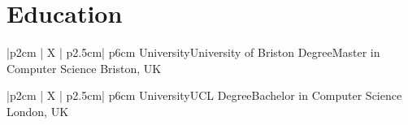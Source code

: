 
\section{Education}
\begin{mySectionContents}
%
%
\iftrue %
\begin{myTableEnv}{|p{2cm} | X | p{2.5cm}| p{6cm}}
    \myRow
        {\myPeriod}{}%
        {University}{University of Briston} %
    \myRow
        {Degree}{Master in Computer Science} %
        {\myLocation}{Briston, UK}%
    \myTableContents{
    }
\end{myTableEnv}
%
%
\myTablesSeparator
%
%
\fi%
%
%
\iftrue %
\begin{myTableEnv}{|p{2cm} | X | p{2.5cm}| p{6cm}}
    \myRow
        {\myPeriod}{}%
        {University}{UCL} %
    \myRow
        {Degree}{Bachelor in Computer Science} %
        {\myLocation}{London, UK}%

\end{myTableEnv}
%
%
\myTablesSeparator
%
%
\fi%
%
%
\end{mySectionContents}
